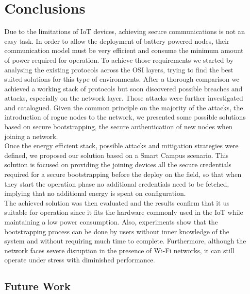 
\chapter{Conclusions}
\label{chapter:conclusion}
Due to the limitations of \gls{IoT} devices, achieving secure communications is not an easy task. In order to allow the deployment of battery powered nodes, their communication model must be very efficient and consume the minimum amount of power required for operation. To achieve those requirements we started by analysing the existing protocols across the OSI layers, trying to find the best suited solutions for this type of environments. After a thorough comparison we achieved a working stack of protocols but soon discovered possible breaches and attacks, especially on the network layer. Those attacks were further investigated and catalogued. Given the common principle on the majority of the attacks, the introduction of rogue nodes to the network, we presented some possible solutions based on secure bootstrapping, the secure authentication of new nodes when joining a network.\\
Once the energy efficient stack, possible attacks and mitigation strategies were defined, we proposed our solution based on a Smart Campus scenario. This solution is focused on providing the joining devices all the secure credentials required for a secure bootstrapping before the deploy on the field, so that when they start the operation phase no additional credentials need to be fetched, implying that no additional energy is spent on configuration.\\
The achieved solution was then evaluated and the results confirm that it us suitable for operation since it fits the hardware commonly used in the \gls{IoT} while maintaining a low power consumption. Also, experiments show that the bootstrapping process can be done by users without inner knowledge of the system and without requiring much time to complete. Furthermore, although the network faces severe disruption in the presence of Wi-Fi networks, it can still operate under stress with diminished performance.

\section{Future Work}

